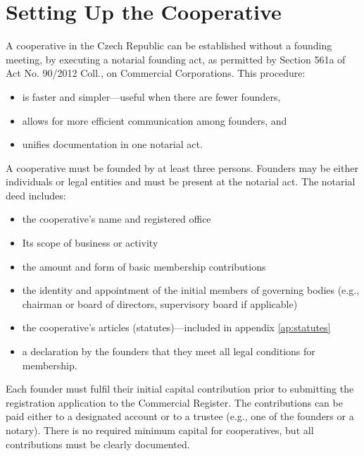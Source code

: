 \section{Setting Up the Cooperative}\label{sec:coop-setup}
A cooperative in the Czech Republic can be established without a founding meeting, by executing a notarial founding act, as permitted by Section 561a of Act No. 90/2012 Coll., on Commercial Corporations\cite{ZOK}. This procedure:
\begin{itemize}
    \item is faster and simpler---useful when there are fewer founders,
    \item allows for more efficient communication among founders, and
    \item unifies documentation in one notarial act.
\end{itemize}
A cooperative must be founded by at least three persons. Founders may be either individuals or legal entities and must be present at the notarial act. The notarial deed includes:
\begin{itemize}
    \item the cooperative’s name and registered office
    \item Its scope of business or activity
    \item the amount and form of basic membership contributions
    \item the identity and appointment of the initial members of governing bodies (e.g., chairman or board of directors, supervisory board if applicable)
    \item the cooperative's articles (statutes)---included in appendix \ref{ap:statutes} 
    \item a declaration by the founders that they meet all legal conditions for membership.\cite{coop-funding}
\end{itemize}
Each founder must fulfil their initial capital contribution prior to submitting the registration application to the Commercial Register. The contributions can be paid either to a designated account or to a trustee (e.g., one of the founders or a notary). There is no required minimum capital for cooperatives, but all contributions must be clearly documented.
\cite{coop-funding}

